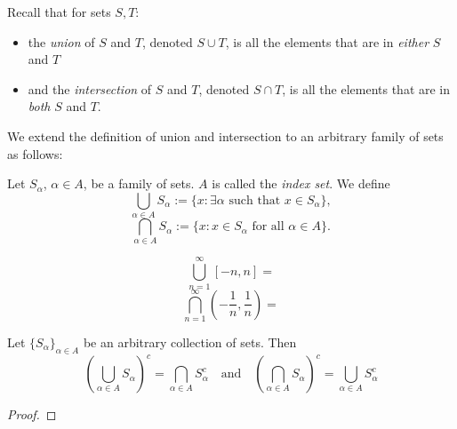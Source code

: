 \documentclass [aspectratio=169, handout]{beamer}
\begin{document}
\begin{frame}

Recall that for sets $S, T$:
    \begin{itemize}
    	\item  the \emph{union} of $S$ and $T$, denoted $S \cup T$, is all the elements that are in \emph{either} $S$ and $T$
	\item  and the \emph{intersection} of $S$ and $T$, denoted $S \cap T$, is all the elements that are in \emph{both} $S$ and $T$.
    \end{itemize}

We extend the definition of union and intersection to an arbitrary family of sets as follows:

\begin{definition}
Let $S_\alpha$, $\alpha \in A$, be a family of sets. $A$ is called the \emph{index set}. We define
\begin{equation*}
    \bigcup_{\alpha \in A} S_\alpha := \{ x: \exists \alpha \text{ such that } x \in S_\alpha \},
\end{equation*}
\begin{equation*}
    \bigcap_{\alpha \in A} S_\alpha := \{ x: x \in S_\alpha \text{ for all } \alpha \in A \}.
\end{equation*}
\end{definition}

\end{frame}

\begin{frame}

\begin{example}
$$\bigcup_{n=1}^\infty [-n,n] = $$
$$\bigcap_{n=1}^\infty \left( -\frac{1}{n},\frac{1}{n} \right) = $$
\end{example}

\end{frame}


\begin{frame}
\begin{theorem}
Let $\{S_\alpha\}_{\alpha \in A}$ be an arbitrary collection of sets. Then 
\begin{equation*}
    \left( \bigcup_{\alpha \in A} S_\alpha \right)^c = \bigcap_{\alpha \in A}  S_\alpha^c \quad \text{and} \quad \left( \bigcap_{\alpha \in A} S_\alpha \right)^c = \bigcup_{\alpha \in A}  S_\alpha^c
\end{equation*}
\end{theorem}
\begin{proof}
\vspace{3cm}
\end{proof}

\end{frame}
\end{document}

